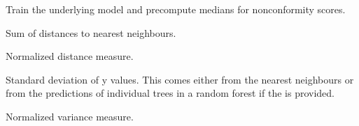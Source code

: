 \documentclass[letterpaper,10pt,english]{sphinxmanual}
\begin{document}
\begin{fulllineitems}
\begin{fulllineitems}
\end{fulllineitems}


\begin{fulllineitems}
\label{cp.nonconformity:cp.nonconformity.AbsErrorNormalized.fit}
Train the underlying model and precompute medians for nonconformity scores.

\end{fulllineitems}


\begin{fulllineitems}
\label{cp.nonconformity:cp.nonconformity.AbsErrorNormalized._d}
Sum of distances to nearest neighbours.

\end{fulllineitems}


\begin{fulllineitems}
\label{cp.nonconformity:cp.nonconformity.AbsErrorNormalized._lambda}
Normalized distance measure.

\end{fulllineitems}


\begin{fulllineitems}
\label{cp.nonconformity:cp.nonconformity.AbsErrorNormalized._sigma}
Standard deviation of y values. This comes either from the nearest neighbours or from the
predictions of individual trees in a random forest if the  is provided.

\end{fulllineitems}


\begin{fulllineitems}
\label{cp.nonconformity:cp.nonconformity.AbsErrorNormalized._xi}
Normalized variance measure.

\end{fulllineitems}


\end{fulllineitems}
\end{document}
